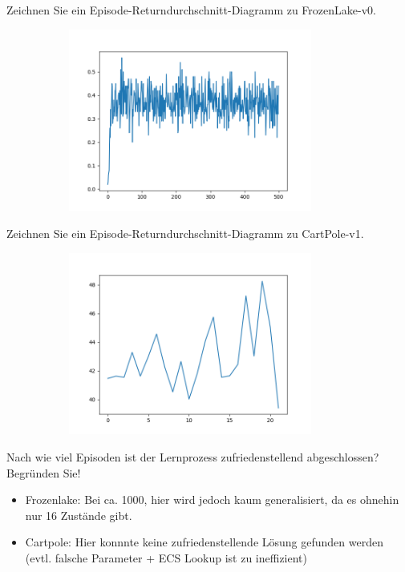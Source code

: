 \documentclass{ocbeameruni}
\begin{document}
\begin{frame}{1.3}
Zeichnen Sie ein Episode-Returndurchschnitt-Diagramm zu FrozenLake-v0.
\begin{figure}[ht]
    \centering
    \includegraphics[width=100mm, height=60mm]{plots/frozen.png} 
\end{figure}
\end{frame}

\begin{frame}{1.4}
Zeichnen Sie ein Episode-Returndurchschnitt-Diagramm zu CartPole-v1.
\begin{figure}[ht]
    \centering
    \includegraphics[width=100mm, height=60mm]{plots/cartpole_1.png} 
\end{figure}
\end{frame}

\begin{frame}{1.5}
Nach wie viel Episoden ist der Lernprozess zufriedenstellend abgeschlossen? Begründen Sie!
    \begin{itemize}
    \item Frozenlake: Bei ca. 1000, hier wird jedoch kaum generalisiert, da es ohnehin nur 16 Zustände gibt.
    \item Cartpole: Hier konnnte keine zufriedenstellende Lösung gefunden werden (evtl. falsche Parameter + ECS Lookup ist zu ineffizient)
    \end{itemize}
\end{frame}
\end{document}
